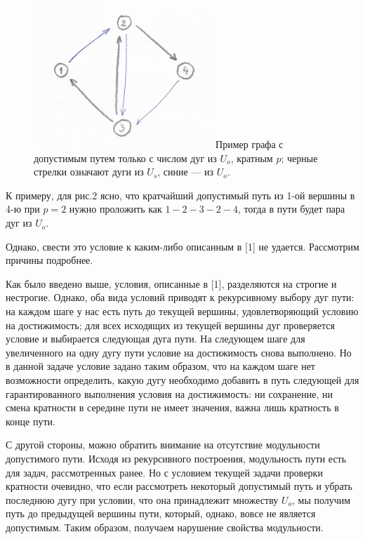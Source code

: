 \begin{figure}
	\centering
	{\includegraphics[width=0.6\textwidth]{img/2.png}}
	{Пример графа с допустимым путем только с числом дуг из $U_o$, кратным $p$; черные стрелки означают дуги из $U_s$, синие --- из $U_o$.}
	\label{fig:pic_2}
\end{figure}

К примеру, для рис.2 ясно, что кратчайший допустимый путь из 1-ой вершины в 4-ю при $p = 2$ нужно проложить как $1-2-3-2-4$, тогда в пути будет пара дуг из $U_o$.

Однако, свести это условие к каким-либо описанным в [1] не удается. Рассмотрим причины подробнее.

Как было введено выше, условия, описанные в [1], разделяются на строгие и нестрогие. Однако, оба вида условий приводят к рекурсивному выбору дуг пути: на каждом шаге у нас есть путь до текущей вершины, удовлетворяющий условию на достижимость; для всех исходящих из текущей вершины дуг проверяется условие и выбирается следующая дуга пути. На следующем шаге для увеличенного на одну дугу пути условие на достижимость снова выполнено. Но в данной задаче условие задано таким образом, что на каждом шаге нет возможности определить, какую дугу необходимо добавить в путь следующей для гарантированного выполнения условия на достижимость: ни сохранение, ни смена кратности в середине пути не имеет значения, важна лишь кратность в конце пути. 

С другой стороны, можно обратить внимание на отсутствие модульности допустимого пути. Исходя из рекурсивного построения, модульность пути есть для задач, рассмотренных ранее. Но с условием текущей задачи проверки кратности очевидно, что если рассмотреть некоторый допустимый путь и убрать последнюю дугу при условии, что она принадлежит множеству $U_o$, мы получим путь до предыдущей вершины пути, который, однако, вовсе не является допустимым. Таким образом, получаем нарушение свойства модульности. 

